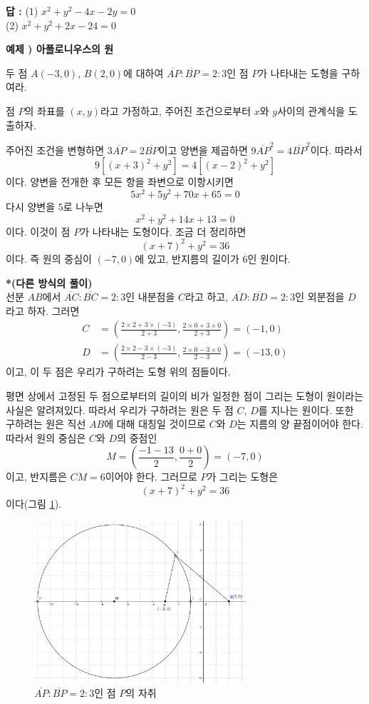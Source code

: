 \documentclass{article}
\newcounter{num}
\newcommand{\exam}[1]
{\bigskip\noindent\refstepcounter{num}\textbf{예제 \arabic{num}) #1}\par}
\newcommand{\sol}{\par\bigskip\noindent{\bfseries풀이)}\par}
\newcommand{\ans}[1]{{\raggedleft\textbf{답 : }#1\par}}
\begin{document}
\ans{
(1) \(x^2+y^2-4x-2y=0\)\\
(2) \(x^2+y^2+2x-24=0\)
}

%
\exam{아폴로니우스의 원}
두 점 \(A(-3,0)\), \(B(2,0)\)에 대하여 \(\overline{AP}:\overline{BP}=2:3\)인 점 \(P\)가 나타내는 도형을 구하여라.

\sol
점 \(P\)의 좌표를 \((x,y)\)라고 가정하고, 주어진 조건으로부터 \(x\)와 \(y\)사이의  관계식을 도출하자.

주어진 조건을 변형하면 \(3\overline{AP}=2\overline{BP}\)이고 양변을 제곱하면 \(9\overline{AP}^2=4\overline{BP}^2\)이다.
따라서
\[9[(x+3)^2+y^2]=4[(x-2)^2+y^2]\]
이다.
양변을 전개한 후 모든 항을 좌변으로 이항시키면
\[5x^2+5y^2+70x+65=0\]
다시 양변을 \(5\)로 나누면
\[x^2+y^2+14x+13=0\]
이다.
이것이 점 \(P\)가 나타내는 도형이다.
조금 더 정리하면
\[(x+7)^2+y^2=36\]
이다.
즉 원의 중심이 \((-7,0)\)에 있고, 반지름의 길이가 \(6\)인 원이다.

\textbf{*(다른 방식의 풀이)}\\
선분 \(AB\)에서 \(\overline{AC}:\overline{BC}=2:3\)인 내분점을 \(C\)라고 하고, \(\overline{AD}:\overline{BD}=2:3\)인 외분점을 \(D\)라고 하자.
그러면
\begin{align*}
C&=\left(\frac{2\times2+3\times(-3)}{2+3},\frac{2\times0+3\times0}{2+3}\right)=\left(-1,0\right)\\
D&=\left(\frac{2\times2-3\times(-3)}{2-3},\frac{2\times0-3\times0}{2-3}\right)=\left(-13,0\right)
\end{align*}
이고, 이 두 점은 우리가 구하려는 도형 위의 점들이다.

평면 상에서 고정된 두 점으로부터의 길이의 비가 일정한 점이 그리는 도형이 원이라는 사실은 알려져있다.
따라서 우리가 구하려는 원은 두 점 \(C\), \(D\)를 지나는 원이다.
또한 구하려는 원은 직선 \(AB\)에 대해 대칭일 것이므로 \(C\)와 \(D\)는 지름의 양 끝점이어야 한다.
따라서 원의 중심은 \(C\)와 \(D\)의 중점인
\[M=\left(\frac{-1-13}2,\frac{0+0}2\right)=(-7,0)\]
이고, 반지름은 \(\overline{CM}=6\)이어야 한다.
그러므로 \(P\)가 그리는 도형은
\[(x+7)^2+y^2=36\]
이다(그림 \ref{appolonius}).

\begin{figure}[h!]
\center
\includegraphics[width=0.7\textwidth]{appolonius}
\caption{\(\overline{AP}:\overline{BP}=2:3\)인 점 \(P\)의 자취}
\label{appolonius}
\end{figure}
\end{document}
